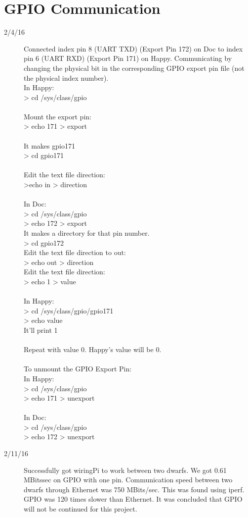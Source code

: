\section{GPIO Communication}
\begin{description}
\item [2/4/16]  Connected index pin 8 (UART TXD) (Export Pin 172) on Doc to index pin 6 (UART RXD) (Export Pin 171) on Happy. Communicating by changing the physical bit in the corresponding GPIO export pin file (not the physical index number).  \\

In Happy: \\
> cd /sys/class/gpio \\ \\
Mount the export pin: \\
> echo 171 > export \\ \\
It makes gpio171\\
> cd gpio171 \\ \\
Edit the text file direction:\\
>echo in > direction \\ \\
In Doc: \\
> cd /sys/class/gpio \\
> echo 172 > export \\
It makes a directory for that pin number. \\
> cd gpio172 \\
Edit the text file direction to out: \\
> echo out > direction \\
Edit the text file direction: \\
> echo 1 > value \\ \\
In Happy: \\
> cd /sys/class/gpio/gpio171 \\
> echo value \\
It'll print 1 \\ \\
Repeat with value 0. Happy's value will be 0. \\ \\
To unmount the GPIO Export Pin: \\
In Happy: \\
> cd /sys/class/gpio \\
> echo 171 > unexport \\ \\
In Doc: \\
> cd /sys/class/gpio \\
> echo 172 > unexport

\item [2/11/16] Successfully got wiringPi to work between two dwarfs. We got 0.61 MBits\/sec on GPIO with one pin. Communication speed between two dwarfs through Ethernet was 750 MBits/sec. This was found using iperf. GPIO was 120 times slower than Ethernet. It was concluded that GPIO will not be continued for this project.

\end{description}

